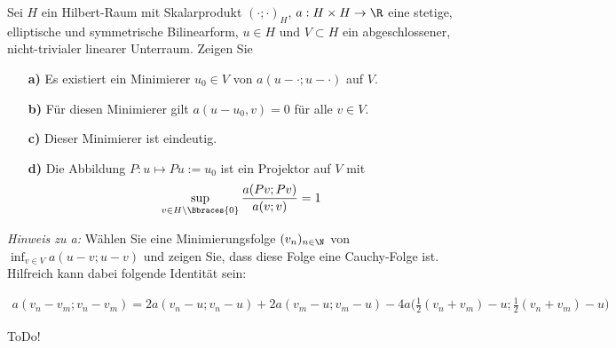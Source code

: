 
\begin{exercise}

Sei $H$ ein Hilbert-Raum mit Skalarprodukt $(\cdot;\cdot)_H$, $a : H \times H \rightarrow \R$
eine stetige, elliptische und symmetrische Bilinearform, $u \in H$ und $V \subset H$ ein abgeschlossener,
nicht-trivialer linearer Unterraum. Zeigen Sie
\begin{itemize}
  \item[\textbf{a)}]
    Es existiert ein Minimierer $u_0 \in V$ von $a(u- \cdot; u- \cdot)$ auf $V$.
  \item[\textbf{b)}]
    Für diesen Minimierer gilt $a(u-u_0,v) = 0$ für alle $v \in V$.
  \item[\textbf{c)}]
    Dieser Minimierer ist eindeutig.
  \item[\textbf{d)}]
    Die Abbildung $P: u \mapsto Pu := u_0$ ist ein Projektor auf $V$ mit
    \begin{align}
      \sup_{v \in H \setminus \Bbraces{0}}
      \frac{a(Pv;Pv)}{a(v;v)} = 1
    \end{align}
\end{itemize}
\textit{Hinweis zu a:} Wählen Sie eine Minimierungsfolge $(v_n)_{n \in \N}$ von
$\inf_{v \in V} a(u-v;u-v)$ und zeigen Sie, dass diese Folge eine Cauchy-Folge ist.
Hilfreich kann dabei folgende Identität sein:

\begin{align}
  a(v_n - v_m ; v_n - v_m )
  =
  2a(v_n - u; v_n - u) + 2a(v_m - u; v_m - u) -
  4a\Bigg(\frac{1}{2}(v_n + v_m ) - u;\frac{1}{2}(v_n + v_m )- u\Bigg)
\end{align}
\end{exercise}


\begin{solution}

ToDo!

\end{solution}

